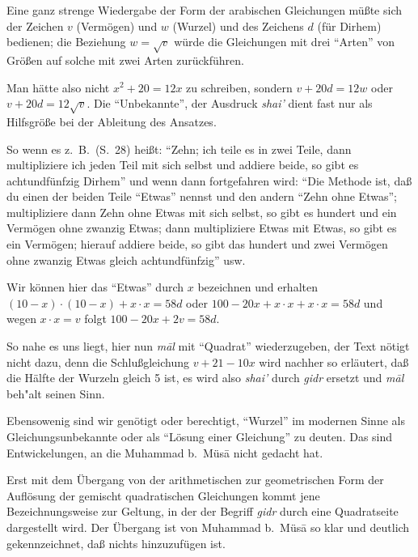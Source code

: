 \documentclass[11pt,a4paper]{article}
\newcommand{\enquote}[1]{``#1''}
\begin{document}
Eine ganz strenge Wiedergabe der Form der arabischen Gleichungen m\"u\ss{}te sich der Zeichen $v$ (Verm\"ogen) und $w$ (Wurzel) und des Zeichens $d$ (f\"ur Dirhem) bedienen; die Beziehung $w = \sqrt{v}$ w\"urde die Gleichungen mit drei \enquote{Arten} von Gr\"o\ss{}en auf solche mit zwei Arten zur\"uckf\"uhren.

Man h\"atte also nicht $x^{2} + 20 = 12x$ zu schreiben, sondern $v + 20d = 12w$ oder $v + 20d = 12\sqrt{v}$. Die \enquote{Unbekannte}, der Ausdruck \textit{shai'} dient fast nur als Hilfsgr\"o\ss{}e bei der Ableitung des Ansatzes.

So wenn es z.\ B.\ (S.\ 28) hei\ss{}t: \enquote{Zehn; ich teile es in zwei Teile, dann multipliziere ich jeden Teil mit sich selbst und addiere beide, so gibt es achtundf\"unfzig Dirhem} und wenn dann fortgefahren wird: \enquote{Die Methode ist, da\ss{} du einen der beiden Teile \enquote{Etwas} nennst und den andern \enquote{Zehn ohne Etwas}; multipliziere dann Zehn ohne Etwas mit sich selbst, so gibt es hundert und ein Verm\"ogen ohne zwanzig Etwas; dann multipliziere Etwas mit Etwas, so gibt es ein Verm\"ogen; hierauf addiere beide, so gibt das hundert und zwei Verm\"ogen ohne zwanzig Etwas gleich achtundf\"unfzig} usw.

Wir k\"onnen hier das \enquote{Etwas} durch $x$ bezeichnen und erhalten $(10 - x) \cdot (10 - x) + x \cdot x = 58d$ oder $100 - 20x + x \cdot x + x \cdot x = 58d$ und wegen $x \cdot x = v$ folgt $100 - 20x + 2v = 58d$.

So nahe es uns liegt, hier nun \textit{m\=al} mit \enquote{Quadrat} wiederzugeben, der Text n\"otigt nicht dazu, denn die Schlu\ss{}gleichung $v + 21 - 10x$ wird nachher so erl\"autert, da\ss{} die H\"alfte der Wurzeln gleich 5 ist, es wird also \textit{shai'} durch \textit{gidr} ersetzt und \textit{m\=al} beh"alt seinen Sinn.

Ebensowenig sind wir gen\"otigt oder berechtigt, \enquote{Wurzel} im modernen Sinne als Gleichungsunbekannte oder als \enquote{L\"osung einer Gleichung} zu deuten. Das sind Entwickelungen, an die Muhammad b.\ M\"us\=a nicht gedacht hat.

Erst mit dem \"Ubergang von der arithmetischen zur geometrischen Form der Aufl\"osung der gemischt quadratischen Gleichungen kommt jene Bezeichnungsweise zur Geltung, in der der Begriff \textit{gidr} durch eine Quadratseite dargestellt wird. Der \"Ubergang ist von Muhammad b.\ M\"us\=a so klar und deutlich gekennzeichnet, da\ss{} nichts hinzuzuf\"ugen ist.
\end{document}

